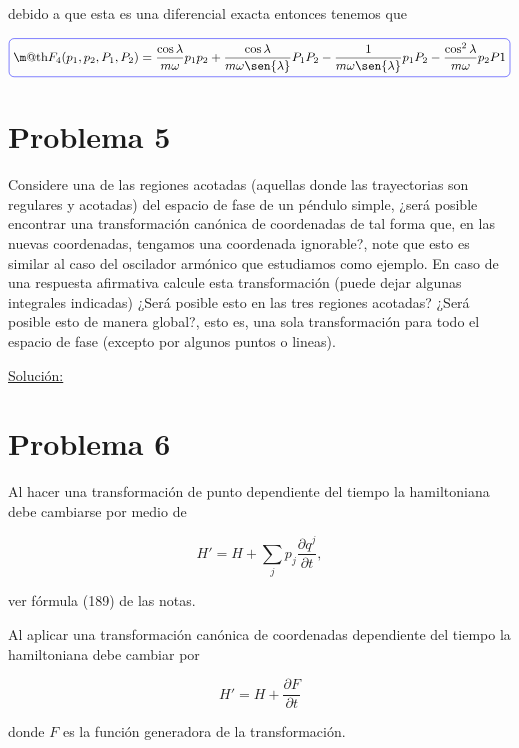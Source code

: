 \documentclass[a4paper,10pt]{article}
\makeatletter
\numberwithin{equation}{section}
\newcommand*{\boxcolor}{blue}
\renewcommand{\boxed}[1]{\textcolor{\boxcolor}{%
\tikz[baseline={([yshift=-1ex]current bounding box.center)}] \node [rectangle, minimum width=1ex,rounded corners,draw] {\normalcolor\m@th$\displaystyle#1$};}}
\makeatother
\begin{document}
debido a que esta es una diferencial exacta entonces tenemos que 

\begin{equation}
 \boxed{F_4(p_1,p_2,P_1,P_2) = \frac{\cos{\lambda}}{m\omega}p_1p_2 + 
 \frac{\cos{\lambda}}{m\omega\sen{\lambda}}P_1P_2 -
 \frac{1}{m\omega\sen{\lambda}}p_1P_2 - \frac{\cos^2{\lambda}}{m\omega}p_2P1}
\end{equation}






\section{Problema 5}

Considere una de las regiones acotadas (aquellas donde las trayectorias son regulares 
y acotadas) del espacio de fase de un péndulo simple, ¿será posible encontrar una 
transformación canónica de coordenadas de tal forma que, en las nuevas coordenadas, 
tengamos una coordenada ignorable?, note que esto es similar al caso del oscilador 
armónico que estudiamos como ejemplo. En caso de una respuesta afirmativa calcule 
esta transformación (puede dejar algunas integrales indicadas) ¿Será posible 
esto en las tres regiones acotadas? ¿Será posible esto de manera global?, esto es,
una sola transformación para todo el espacio de fase (excepto por algunos puntos o 
lineas).

\vspace{.3cm}

\underline{Solución:} \vspace{.3cm}

\section{Problema 6}

Al hacer una transformación de punto dependiente del tiempo la hamiltoniana 
debe cambiarse por medio de 

$$
H' = H + \sum_j p_j \frac{\partial q^j}{\partial t},
$$

ver fórmula (189) de las notas.

\vspace{.3cm}

Al aplicar una transformación canónica de coordenadas dependiente del tiempo la 
hamiltoniana debe cambiar por 

$$
H' = H + \frac{\partial F}{\partial t}
$$

donde $F$ es la función generadora de la transformación. 
\end{document}
